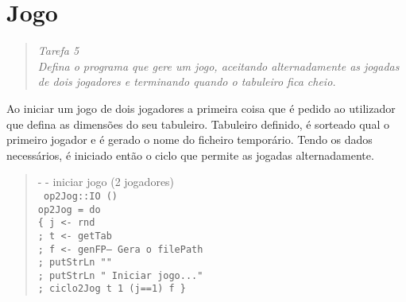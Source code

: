 \documentclass[a4paper,titlepage]{scrreprt}
\begin{document}
\chapter{Jogo}
	\begin{quote}
		\begin{center}
			{\it
			Tarefa 5\\
			Defina o programa que gere um jogo, aceitando alternadamente as jogadas de dois jogadores e terminando quando o tabuleiro fica cheio.
			}
		\end{center}
	\end{quote}
Ao iniciar um jogo de dois jogadores a primeira coisa que é pedido ao utilizador que defina as dimensões do seu tabuleiro. Tabuleiro definido, é
sorteado qual o primeiro jogador e é gerado o nome do ficheiro temporário. Tendo os dados necessários, é iniciado então o ciclo que permite as
jogadas alternadamente.
	\begin{quote}
		{\small - - iniciar jogo (2 jogadores)\\}
		{\tt
		op2Jog::IO ()\\
		op2Jog = do\\
		\{ j <- rnd\\
		; t <- getTab\\
		; f <- genFP--	Gera o filePath\\
		; putStrLn ""\\
		; putStrLn " Iniciar jogo..."\\
		; ciclo2Jog t 1 (j==1) f
		\}
		}
	\end{quote}
\end{document}
